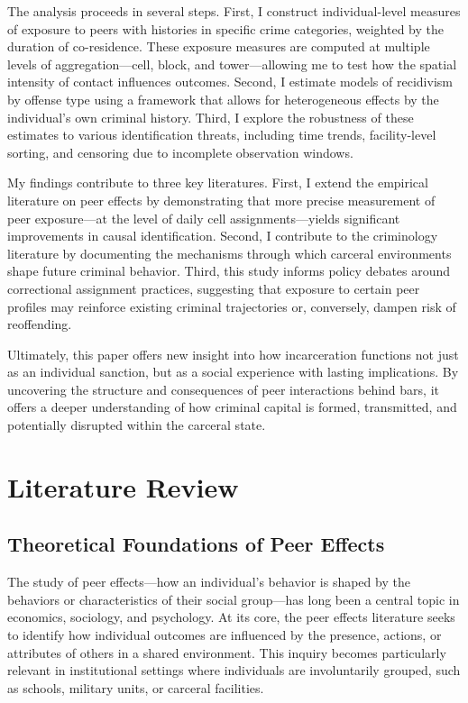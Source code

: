 \documentclass[12pt, a4paper]{article}
\begin{document}
The analysis proceeds in several steps. First, I construct individual-level measures of exposure to peers with histories in specific crime categories, weighted by the duration of co-residence. These exposure measures are computed at multiple levels of aggregation—cell, block, and tower—allowing me to test how the spatial intensity of contact influences outcomes. Second, I estimate models of recidivism by offense type using a framework that allows for heterogeneous effects by the individual's own criminal history. Third, I explore the robustness of these estimates to various identification threats, including time trends, facility-level sorting, and censoring due to incomplete observation windows.

My findings contribute to three key literatures. First, I extend the empirical literature on peer effects by demonstrating that more precise measurement of peer exposure—at the level of daily cell assignments—yields significant improvements in causal identification. Second, I contribute to the criminology literature by documenting the mechanisms through which carceral environments shape future criminal behavior. Third, this study informs policy debates around correctional assignment practices, suggesting that exposure to certain peer profiles may reinforce existing criminal trajectories or, conversely, dampen risk of reoffending.

Ultimately, this paper offers new insight into how incarceration functions not just as an individual sanction, but as a social experience with lasting implications. By uncovering the structure and consequences of peer interactions behind bars, it offers a deeper understanding of how criminal capital is formed, transmitted, and potentially disrupted within the carceral state.


\section{Literature Review}

\subsection{Theoretical Foundations of Peer Effects}

The study of peer effects—how an individual's behavior is shaped by the behaviors or characteristics of their social group—has long been a central topic in economics, sociology, and psychology. At its core, the peer effects literature seeks to identify how individual outcomes are influenced by the presence, actions, or attributes of others in a shared environment. This inquiry becomes particularly relevant in institutional settings where individuals are involuntarily grouped, such as schools, military units, or carceral facilities.
\end{document}
